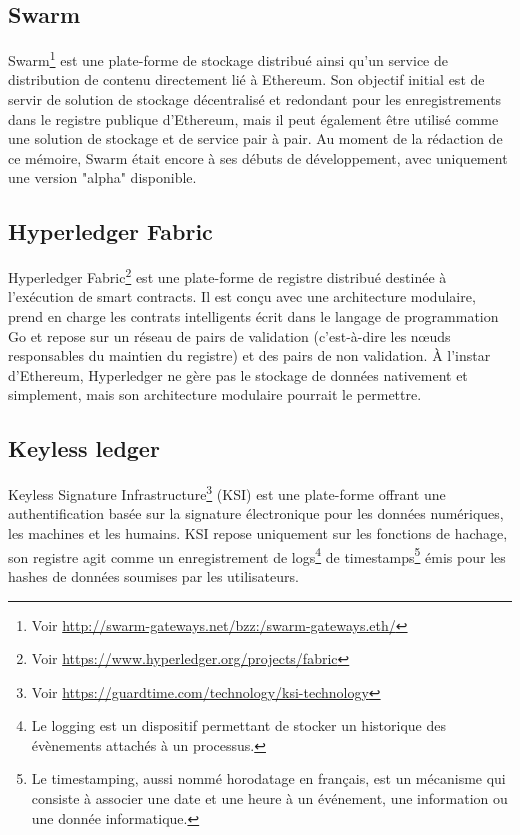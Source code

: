\documentclass{tnreport}
\begin{document}
\subsection{Swarm}

Swarm\footnote{Voir \url{http://swarm-gateways.net/bzz:/swarm-gateways.eth/}} est une plate-forme de stockage distribué ainsi qu'un service de distribution de contenu directement lié à Ethereum. Son objectif initial est de servir de solution de stockage décentralisé et redondant pour les enregistrements dans le registre publique d'Ethereum, mais il peut également être utilisé comme une solution de stockage et de service pair à pair. Au moment de la rédaction de ce mémoire, Swarm était encore à ses débuts de développement, avec uniquement une version "alpha" disponible.

\subsection{Hyperledger Fabric}

Hyperledger Fabric\footnote{Voir \url{https://www.hyperledger.org/projects/fabric}} est une plate-forme de registre distribué destinée à l'exécution de smart contracts. Il est conçu avec une architecture modulaire, prend en charge les contrats intelligents écrit dans le langage de programmation Go et repose sur un réseau de pairs de validation (c'est-à-dire les nœuds responsables du maintien du registre) et des pairs de non validation. À l'instar d'Ethereum, Hyperledger ne gère pas le stockage de données nativement et simplement, mais son architecture modulaire pourrait le permettre.

\subsection{Keyless ledger}

Keyless Signature Infrastructure\footnote{Voir \url{https://guardtime.com/technology/ksi-technology}} (KSI) est une plate-forme offrant une authentification basée sur la signature électronique pour les données numériques, les machines et les humains. KSI repose uniquement sur les fonctions de hachage, son registre agit comme un enregistrement de logs\footnote{Le logging est un dispositif permettant de stocker un historique des évènements attachés à un processus.} de timestamps\footnote{Le timestamping, aussi nommé horodatage en français, est un mécanisme qui consiste à associer une date et une heure à un événement, une information ou une donnée informatique.} émis pour les hashes de données soumises par les utilisateurs.
\end{document}
